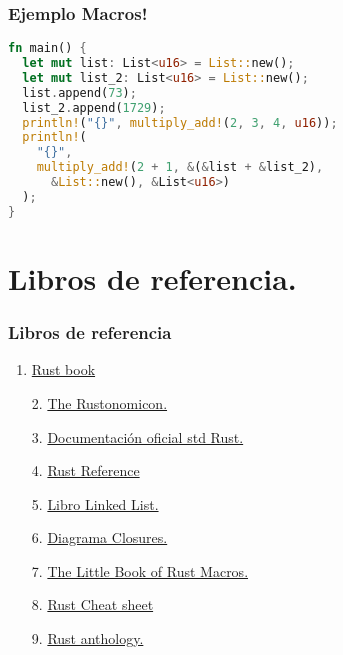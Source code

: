 \documentclass{beamer}
\begin{document}
\begin{frame}[fragile]
  \frametitle{Ejemplo Macros!}
  \begin{lstlisting}[language=Rust , style=boxed]
fn main() {
  let mut list: List<u16> = List::new();
  let mut list_2: List<u16> = List::new();
  list.append(73);
  list_2.append(1729);
  println!("{}", multiply_add!(2, 3, 4, u16));
  println!(
    "{}",
    multiply_add!(2 + 1, &(&list + &list_2),
      &List::new(), &List<u16>)
  );
}\end{lstlisting}
\end{frame}
\section{Libros de referencia.}
\begin{frame}
  \frametitle{Libros de referencia}
  \begin{enumerate}[1.]
    \item \href{https://doc.rust-lang.org/book/}{Rust book}
    \item [2.] \href{https://doc.rust-lang.org/nomicon/}{The Rustonomicon.} 
    \item [3.] \href{https://doc.rust-lang.org/std/index.html}{Documentación oficial std Rust.}
    \item [4.] \href{https://doc.rust-lang.org/stable/reference/}{Rust Reference} 
    \item [5.] \href{https://rust-unofficial.github.io/too-many-lists/}{Libro Linked List.}
    \item [6.] \href{https://zhauniarovich.com/post/2020/2020-12-closures-in-rust/}{Diagrama Closures.}
    \item [7.] \href{https://veykril.github.io/tlborm/}{The Little Book of Rust Macros.}
    \item [8.] \href{https://cheats.rs/}{Rust Cheat sheet}
    \item [9.] \href{https://github.com/brson/rust-anthology/blob/master/master-list.md\#rust-anthology-master-list}{Rust anthology.} 
  \end{enumerate}
\end{frame}
\end{document}
